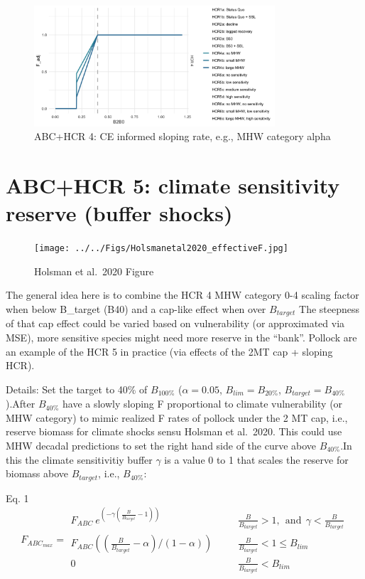 \documentclass[
]{article}
\begin{document}
\begin{figure}
\centering
\includegraphics[width=0.8\textwidth,height=\textheight]{../../Figs/HCR_figs/HCR4.png}
\caption{ABC+HCR 4: CE informed sloping rate, e.g., MHW category alpha}
\end{figure}

\section{ABC+HCR 5: climate sensitivity reserve (buffer
shocks)}\label{abchcr-5-climate-sensitivity-reserve-buffer-shocks}

\begin{figure}
\centering
\texttt{[image: ../../Figs/Holsmanetal2020\_effectiveF.jpg]}
\caption{Holsman et al.~2020 Figure}
\end{figure}

The general idea here is to combine the HCR 4 MHW category 0-4 scaling
factor when below B\_target (B40) and a cap-like effect when over
\(B_{target}\) The steepness of that cap effect could be varied based on
vulnerability (or approximated via MSE), more sensitive species might
need more reserve in the ``bank''. Pollock are an example of the HCR 5
in practice (via effects of the 2MT cap + sloping HCR).

Details: Set the target to 40\% of \(B_{100\%}\) (\(\alpha = 0.05\),
\(B_{lim} = B_{20\%}\), \(B_{target} = B_{40\%}\)).After \(B_{40\%}\)
have a slowly sloping F proportional to climate vulnerability (or MHW
category) to mimic realized F rates of pollock under the 2 MT cap, i.e.,
reserve biomass for climate shocks sensu Holsman et al.~2020. This could
use MHW decadal predictions to set the right hand side of the curve
above \(B_{40\%}\).In this the climate sensitivitiy buffer \(\gamma\) is
a value 0 to 1 that scales the reserve for biomass above \(B_{target}\),
i.e., \(B_{40\%}\):

Eq. 1 \[F_{ABC_{max}} = \begin{array}{lll}  
 F_{ABC}\ e^{(-\gamma(\frac{B}{B_{target}}-1))} &~~~~~~~~\frac{B}{B_{target}}>1, ~~\mathrm{and}~~ \gamma < \frac{B}{B_{target}}\\ 
 F_{ABC}((\frac{B}{B_{target}}-\alpha)/(1-\alpha)) &~~~~~~~~ \frac{B}{B_{target}} < 1 \leq B_{lim} \\  
 0 &~~~~~~~~ \frac{B}{B_{target}} < B_{lim}  
 \end{array}
 \]
\end{document}
